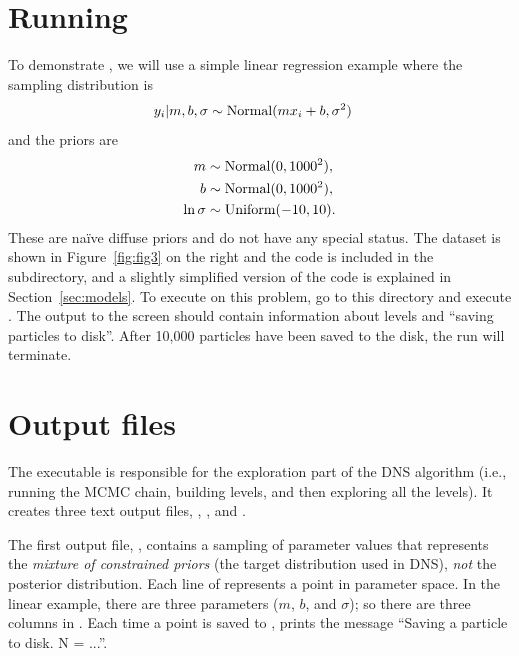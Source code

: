 \documentclass[article]{jss}
\begin{document}
\section[Running DNest4]{Running }\label{sec:running}
To demonstrate ,
we will use a simple linear regression example where the
sampling distribution is
\begin{align*}
y_i | m, b, \sigma &\sim \textnormal{Normal}(mx_i + b, \sigma^2)
\end{align*}
and the priors are
\begin{align*}
m &\sim \textnormal{Normal}(0, 1000^2),\\
b &\sim \textnormal{Normal}(0, 1000^2),\\
\ln\sigma &\sim \textnormal{Uniform}(-10, 10).
\end{align*}
These are na{\"i}ve diffuse priors and do not have any special status.
The dataset is shown in Figure~\ref{fig:fig3} on the right
and the code is included in the 
subdirectory, and a slightly simplified version of the
code is explained in Section~\ref{sec:models}.
To execute  on this problem, go to this directory and
execute . The output to the screen
should contain information about levels and ``saving particles to disk''.
After 10,000 particles have been saved to the disk, the run will terminate.

\section{Output files}
The executable  is responsible for the exploration part of the
DNS algorithm (i.e., running the MCMC chain, building
levels, and then exploring all the levels). It creates three text output files,
, , and .

The first output
file, , contains a sampling of parameter values that
represents the {\it mixture of constrained priors} (the target distribution
used in DNS), \emph{not} the
posterior distribution. Each line of  represents a point in
parameter space. In the linear example, there are three parameters
($m$, $b$, and $\sigma$); so there
are three columns in .
Each time a point is saved to ,  prints
the message ``Saving a particle to disk. N = ...''.
\end{document}
